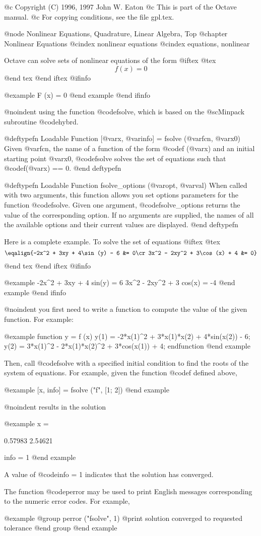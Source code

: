 @c Copyright (C) 1996, 1997 John W. Eaton
@c This is part of the Octave manual.
@c For copying conditions, see the file gpl.tex.

@node Nonlinear Equations, Quadrature, Linear Algebra, Top
@chapter Nonlinear Equations
@cindex nonlinear equations
@cindex equations, nonlinear

Octave can solve sets of nonlinear equations of the form
@iftex
@tex
$$
 f (x) = 0
$$
@end tex
@end iftex
@ifinfo

@example
F (x) = 0
@end example
@end ifinfo

@noindent
using the function @code{fsolve}, which is based on the @sc{Minpack}
subroutine @code{hybrd}.

@deftypefn {Loadable Function} {[@var{x}, @var{info}] =} fsolve (@var{fcn}, @var{x0})
Given @var{fcn}, the name of a function of the form @code{f (@var{x})}
and an initial starting point @var{x0}, @code{fsolve} solves the set of
equations such that @code{f(@var{x}) == 0}.
@end deftypefn

@deftypefn {Loadable Function} {} fsolve_options (@var{opt}, @var{val})
When called with two arguments, this function allows you set options
parameters for the function @code{fsolve}.  Given one argument,
@code{fsolve_options} returns the value of the corresponding option.  If
no arguments are supplied, the names of all the available options and
their current values are displayed.
@end deftypefn

Here is a complete example.  To solve the set of equations
@iftex
@tex
$$
 \eqalign{-2x^2 + 3xy + 4\sin(y) - 6 &= 0\cr
           3x^2 - 2xy^2 + 3\cos(x) + 4 &= 0}
$$
@end tex
@end iftex
@ifinfo

@example
-2x^2 + 3xy   + 4 sin(y) = 6
 3x^2 - 2xy^2 + 3 cos(x) = -4
@end example
@end ifinfo

@noindent
you first need to write a function to compute the value of the given
function.  For example:

@example
function y = f (x)
  y(1) = -2*x(1)^2 + 3*x(1)*x(2)   + 4*sin(x(2)) - 6;
  y(2) =  3*x(1)^2 - 2*x(1)*x(2)^2 + 3*cos(x(1)) + 4;
endfunction
@end example

Then, call @code{fsolve} with a specified initial condition to find the
roots of the system of equations.  For example, given the function
@code{f} defined above,

@example
[x, info] = fsolve ("f", [1; 2])
@end example

@noindent
results in the solution

@example
x =

  0.57983
  2.54621

info = 1
@end example

A value of @code{info = 1} indicates that the solution has converged.

The function @code{perror} may be used to print English messages
corresponding to the numeric error codes.  For example,

@example
@group
perror ("fsolve", 1)
     @print{} solution converged to requested tolerance
@end group
@end example


